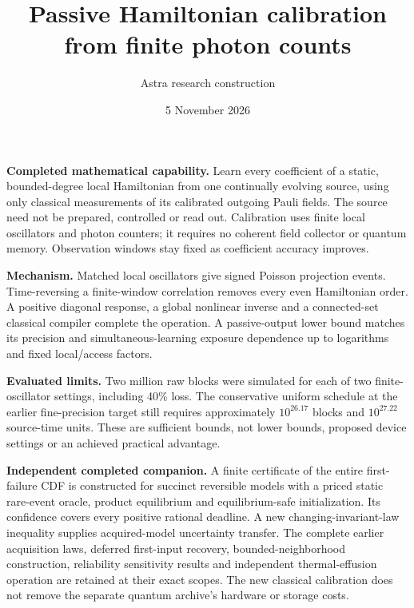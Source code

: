\documentclass[11pt]{article}
\title{\textbf{Passive Hamiltonian calibration\\from finite photon counts}}
\author{Astra research construction}\date{5 November 2026}
\begin{document}
\setlength{\emergencystretch}{3em}
\hypersetup{pageanchor=false}
\begin{titlepage}\maketitle\thispagestyle{empty}\vspace{7mm}
\noindent\textbf{Completed mathematical capability.}
Learn every coefficient of a static, bounded-degree local Hamiltonian from one continually evolving source, using only classical measurements of its calibrated outgoing Pauli fields. The source need not be prepared, controlled or read out. Calibration uses finite local oscillators and photon counters; it requires no coherent field collector or quantum memory. Observation windows stay fixed as coefficient accuracy improves.

\vspace{5mm}\noindent\textbf{Mechanism.}
Matched local oscillators give signed Poisson projection events. Time-reversing a finite-window correlation removes every even Hamiltonian order. A positive diagonal response, a global nonlinear inverse and a connected-set classical compiler complete the operation. A passive-output lower bound matches its precision and simultaneous-learning exposure dependence up to logarithms and fixed local/access factors.

\vspace{5mm}\noindent\textbf{Evaluated limits.}
Two million raw blocks were simulated for each of two finite-oscillator settings, including 40\% loss. The conservative uniform schedule at the earlier fine-precision target still requires approximately \(10^{26.17}\) blocks and \(10^{27.22}\) source-time units. These are sufficient bounds, not lower bounds, proposed device settings or an achieved practical advantage.

\vspace{5mm}\noindent\textbf{Independent completed companion.}
A finite certificate of the entire first-failure CDF is constructed for succinct reversible models with a priced static rare-event oracle, product equilibrium and equilibrium-safe initialization. Its confidence covers every positive rational deadline. A new changing-invariant-law inequality supplies acquired-model uncertainty transfer.
\vfill
\noindent The complete earlier acquisition laws, deferred first-input recovery, bounded-neighborhood construction, reliability sensitivity results and independent thermal-effusion operation are retained at their exact scopes. The new classical calibration does not remove the separate quantum archive's hardware or storage costs.
\end{titlepage}\hypersetup{pageanchor=true}
\tableofcontents\newpage
\end{document}
